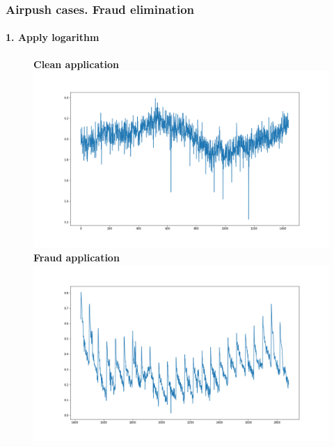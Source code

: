 \documentclass[intlimits, 9pt, unicode]{beamer}
\begin{document}
\begin{frame}
    \frametitle{Airpush cases. Fraud elimination}
    \framesubtitle{1. Apply logarithm}
    \begin{figure}
	\textbf{Clean application}
	\includegraphics[scale=0.10]{images/009_case_1}
	\textbf{Fraud application}
	\includegraphics[scale=0.10]{images/010_case_1}
     \end{figure}
\end{frame}
\end{document}
